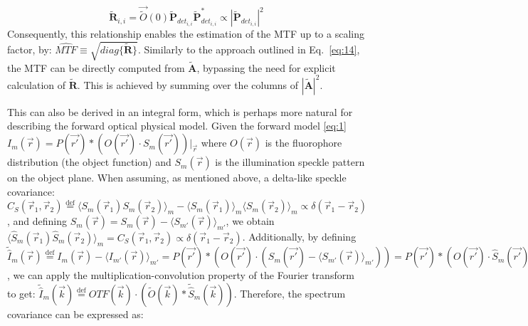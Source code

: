 \documentclass[pdflatex,sn-mathphys-num,Numbered]{sn-jnl}%
\theoremstyle{thmstyleone}%
\theoremstyle{thmstyletwo}%
\theoremstyle{thmstylethree}%
\begin{document}
\begin{equation}
\tilde{\textbf{R}}_{i,i} = \vec{\tilde{O}}(0) {\tilde{\textbf{P}}_{det_{i,i}}}{\tilde{\textbf{P}}^*_{det_{i,i}}} \propto |{\tilde{\textbf{P}}_{det_{i,i}}}|^2
\label{eq:16}  \tag{S16}
\end{equation}
Consequently, this relationship enables the estimation of the MTF up to a scaling factor, by:
$\widehat{MTF} \equiv \sqrt{diag\{\tilde{\textbf{R}}\}}$. %
Similarly to the approach outlined in Eq.~\ref{eq:14}, the MTF can be directly computed from $\tilde{\textbf{A}}$, bypassing the need for explicit calculation of $\tilde{\textbf{R}}$. This is achieved by summing over the columns of $|{\tilde{\textbf{A}}}|^2$.

This can also be derived in an integral form, which is perhaps more natural for describing the forward optical physical model. Given the forward model \ref{eq:1}  $I_{m}(\vec{r}) = P(\vec{r'}) * (O(\vec{r'}) \cdot S_{m}(\vec{r'}))|_{\vec{r}}$ where $O(\vec{r})$ is the fluorophore distribution (the object function) and $S_{m}(\vec{r})$ is the illumination speckle pattern on the object plane. When assuming, as mentioned above, a delta-like speckle covariance: $C_S(\vec{r}_1,\vec{r}_2) \stackrel{\text{def}} = \langle S_m(\vec{r}_1)S_m(\vec{r}_2) \rangle_m - \langle S_m(\vec{r}_1) \rangle_m \langle S_m(\vec{r}_2) \rangle_m \propto\delta(\vec{r}_1-\vec{r}_2)$, and defining $\hat{S}_m(\vec{r})=S_m(\vec{r})-\langle S_{m'}(\vec{r})\rangle_{m'}$, we obtain $\langle \hat{S}_m(\vec{r}_1)\hat{S}_m(\vec{r}_2) \rangle_m =C_S(\vec{r}_1,\vec{r}_2) \propto\delta(\vec{r}_1-\vec{r}_2)$. Additionally, by defining $\tilde{\hat{I}}_m(\vec{r})\stackrel{\text{def}} = I_m(\vec{r})-\langle I_{m'}(\vec{r})\rangle_{m'}=P(\vec{r'}) * (O(\vec{r'}) \cdot (S_{m}(\vec{r'})-\langle S_{m'}(\vec{r})\rangle_{m'}))=P (\vec{r'})* (O(\vec{r'}) \cdot \hat{S}_{m}(\vec{r'}))|_{\vec{r}}$, we can apply the multiplication-convolution property of the Fourier transform to get: $\tilde{\hat{I}}_m(\vec{k})\stackrel{\text{def}} = OTF(\vec{k})\cdot(\tilde{O}(\vec{k})*\tilde{\hat{S}}_m(\vec{k}))$. Therefore, the spectrum covariance can be expressed as:
\end{document}
